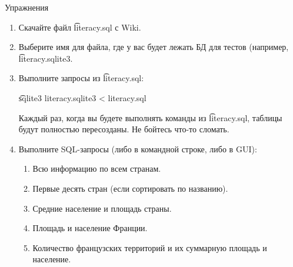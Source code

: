 \begin{frame}{Упражнения}
	\begin{enumerate}
		\item Скачайте файл \t{literacy.sql} с Wiki.
		\item Выберите имя для файла, где у вас будет лежать БД для тестов (например, \t{literacy.sqlite3}.
		\item Выполните запросы из \t{literacy.sql}:
			\begin{center}
				\t{sqlite3 literacy.sqlite3 < literacy.sql}
			\end{center}
			Каждый раз, когда вы будете выполнять команды из \t{literacy.sql}, таблицы
			будут полностью пересозданы.
			Не бойтесь что-то сломать.
		\item
		     Выполните SQL-запросы (либо в командной строке, либо в GUI):
		     \begin{enumerate}
		     	\item Всю информацию по всем странам.
		     	\item Первые десять стран (если сортировать по названию).
		     	\item Средние население и площадь страны.
		     	\item Площадь и население Франции.
		     	\item Количество французских территорий и их суммарную площадь и население.
		     \end{enumerate}
	\end{enumerate}
\end{frame}

